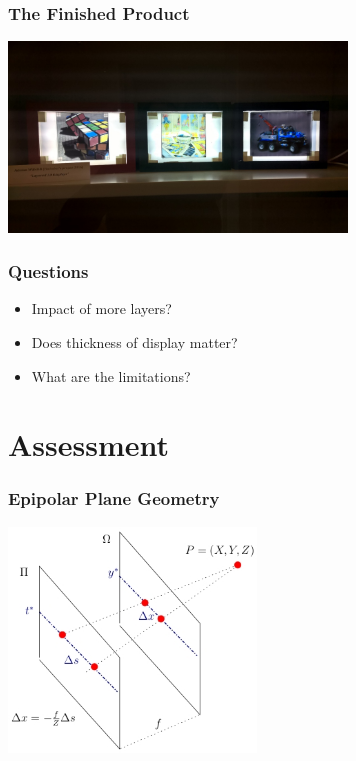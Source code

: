 \documentclass[12pt, compress]{beamer}
\begin{document}
\begin{frame}[fragile]
	\frametitle{The Finished Product}
	\begin{center}
		\includegraphics[width=9cm]{images/all_displays_on}
	\end{center}
\end{frame}

\begin{frame}[fragile]
	\frametitle{Questions}
	
	\begin{itemize}
		\item Impact of more layers?
		\item Does thickness of display matter?
		\item What are the limitations?
	\end{itemize}
\end{frame}

\section{Assessment}

\begin{frame}[fragile]
	\frametitle{Epipolar Plane Geometry}
	\begin{center}
		\includegraphics[height = 6cm]{images/lf_geometry.jpg}
	\end{center}
\end{frame}
\end{document}

